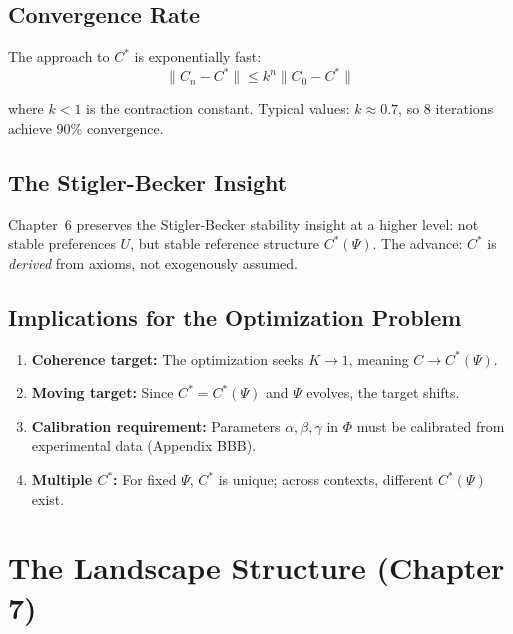 \subsection{Convergence Rate}

The approach to $C^*$ is exponentially fast:
\begin{equation}
\|C_n - C^*\| \leq k^n \|C_0 - C^*\|
\label{eq:mp-cstar-rate}
\end{equation}

where $k < 1$ is the contraction constant. Typical values: $k \approx 0.7$, so 8 iterations achieve 90\% convergence.

\subsection{The Stigler-Becker Insight}

Chapter~6 preserves the Stigler-Becker stability insight at a higher level:
not stable preferences $U$, but stable reference structure $C^*(\Psi)$.
The advance: $C^*$ is \textit{derived} from axioms, not exogenously assumed.

\subsection{Implications for the Optimization Problem}

\begin{enumerate}
\item \textbf{Coherence target:} The optimization seeks $K \to 1$, meaning $C \to C^*(\Psi)$.
\item \textbf{Moving target:} Since $C^* = C^*(\Psi)$ and $\Psi$ evolves, the target shifts.
\item \textbf{Calibration requirement:} Parameters $\alpha, \beta, \gamma$ in $\Phi$ must be calibrated from experimental data (Appendix BBB).
\item \textbf{Multiple $C^*$:} For fixed $\Psi$, $C^*$ is unique; across contexts, different $C^*(\Psi)$ exist.
\end{enumerate}

\section{The Landscape Structure (Chapter 7)}
\label{sec:mp-landscape}

